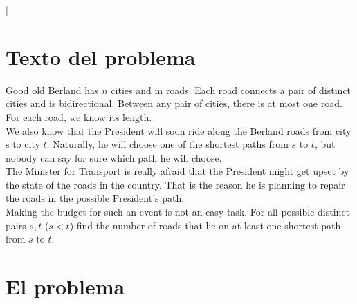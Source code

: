 \documentclass[a4paper,12pt,twocolumn]{article}
\begin{document}





\vspace{0.8cm}
]



\section{Texto del problema}
Good old Berland has $n$ cities and m roads. Each road connects a pair of distinct cities and is bidirectional. Between any pair of cities, there is at most one road. For each road, we know its length.\\

We also know that the President will soon ride along the Berland roads from city s to city $t$. Naturally, he will choose one of the shortest paths from $s$ to $t$, but nobody can say for sure which path he will choose.\\

The Minister for Transport is really afraid that the President might get upset by the state of the roads in the country. That is the reason he is planning to repair the roads in the possible President's path.\\

Making the budget for such an event is not an easy task. For all possible distinct pairs $s, t$ ($s<t$) find the number of roads that lie on at least one shortest path from $s$ to $t$.

\section{El problema}\label{sec:intro}
	
\end{document}
